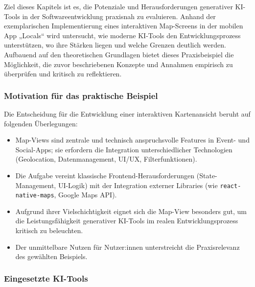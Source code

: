 Ziel dieses Kapitels ist es, die Potenziale und Herausforderungen generativer
KI-Tools in der Softwareentwicklung praxisnah zu evaluieren. Anhand der
exemplarischen Implementierung eines interaktiven Map-Screens in der mobilen
App „Locals“ wird untersucht, wie moderne KI-Tools den Entwicklungsprozess
unterstützen, wo ihre Stärken liegen und welche Grenzen deutlich werden.
Aufbauend auf den theoretischen Grundlagen bietet dieses Praxisbeispiel die
Möglichkeit, die zuvor beschriebenen Konzepte und Annahmen empirisch zu
überprüfen und kritisch zu reflektieren.

\subsubsection{Motivation für das praktische Beispiel}

Die Entscheidung für die Entwicklung einer interaktiven Kartenansicht beruht
auf folgenden Überlegungen:
\begin{itemize}
      \item Map-Views sind zentrale und technisch anspruchsvolle Features in Event- und
            Social-Apps; sie erfordern die Integration unterschiedlicher Technologien
            (Geolocation, Datenmanagement, UI/UX, Filterfunktionen).
      \item Die Aufgabe vereint klassische Frontend-Herausforderungen (State-Management,
            UI-Logik) mit der Integration externer Libraries (wie
            \texttt{react-native-maps}, Google Maps API).
      \item Aufgrund ihrer Vielschichtigkeit eignet sich die Map-View besonders gut, um die
            Leistungsfähigkeit generativer KI-Tools im realen Entwicklungsprozess kritisch
            zu beleuchten.
      \item Der unmittelbare Nutzen für Nutzer:innen unterstreicht die Praxisrelevanz des
            gewählten Beispiels.
\end{itemize}

\subsubsection{Eingesetzte KI-Tools}

